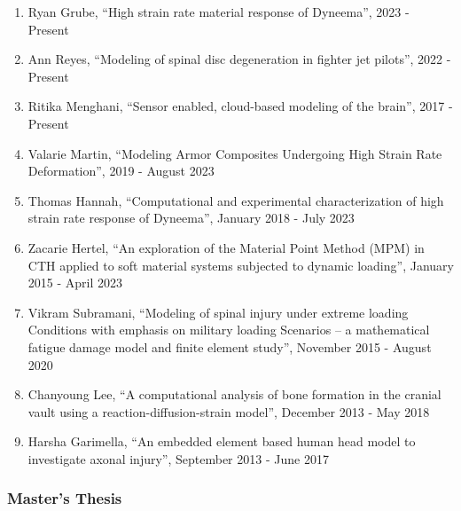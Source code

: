 \documentclass[11pt]{article}
\begin{document}
\begin{enumerate}
\item
  Ryan Grube, ``High strain rate material response of Dyneema'', 2023 - Present
\item
  Ann Reyes, ``Modeling of spinal disc degeneration in fighter jet pilots'', 2022 - Present
\item
  Ritika Menghani, ``Sensor enabled, cloud-based modeling of the brain'', 2017 - Present
\item
  Valarie Martin, ``Modeling Armor Composites Undergoing High Strain Rate Deformation'', 2019 - August 2023
\item
  Thomas Hannah, ``Computational and experimental characterization of high strain rate response of Dyneema'', January 2018 - July 2023
\item
  Zacarie Hertel, ``An exploration of the Material Point Method (MPM) in CTH applied to soft material systems subjected to dynamic loading'', January 2015 - April 2023
\item
  Vikram Subramani, ``Modeling of spinal injury under extreme loading Conditions with emphasis on military loading Scenarios -- a mathematical fatigue damage model and finite element study'', November 2015 - August 2020
\item
  Chanyoung Lee, ``A computational analysis of bone formation in the cranial vault using a reaction-diffusion-strain model'', December 2013 - May 2018
\item
  Harsha Garimella, ``An embedded element based human head model to investigate axonal injury'', September 2013 - June 2017
\end{enumerate}

\subsubsection{Master's Thesis}\label{masters-thesis}
\end{document}
